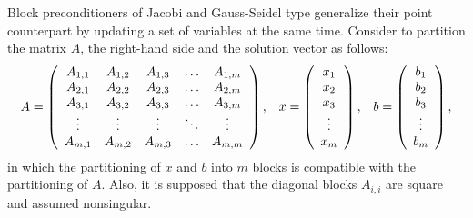 Block preconditioners of Jacobi and Gauss-Seidel type generalize their point
counterpart by updating a set of variables at the same time. Consider
to partition the matrix $A$, the right-hand side and the solution vector
as follows:
\begin{equation}
\label{eq:partition}
A = 
\left(
\begin{array}{c c c c c}
A_{1,1} & A_{1,2} & A_{1,3} & \ldots & A_{1,m} \\
A_{2,1} & A_{2,2} & A_{2,3} & \ldots & A_{2,m} \\
A_{3,1} & A_{3,2} & A_{3,3} & \ldots & A_{3,m} \\
\vdots  & \vdots  & \vdots  & \ddots & \vdots  \\
A_{m,1} & A_{m,2} & A_{m,3} & \ldots & A_{m,m} \\
\end{array}
\right),
  \;\;\;
x = 
\left(
\begin{array}{c c c c c}
x_{1} \\
x_{2} \\
x_{3} \\
\vdots  \\
x_{m}
\end{array}
\right), \;\;\;
b = 
\left(
\begin{array}{c c c c c}
b_{1} \\
b_{2} \\
b_{3} \\
\vdots  \\
b_{m}
\end{array}
\right),
\end{equation}
in which the partitioning of $x$ and $b$ into $m$ blocks is compatible with the partitioning
of $A$. Also, it is supposed that the diagonal blocks $A_{i,i}$ are square
and assumed nonsingular.

